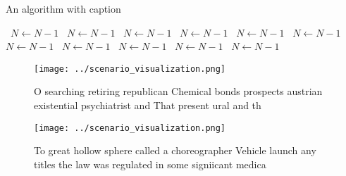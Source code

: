 \documentclass[a4paper]{article}
\begin{document}
\begin{algorithm}
\caption{An algorithm with caption}
\begin{algorithmic}
\    \State $N \gets N - 1$
\    \State $N \gets N - 1$
\    \State $N \gets N - 1$
\    \State $N \gets N - 1$
\    \State $N \gets N - 1$
\    \State $N \gets N - 1$
\    \State $N \gets N - 1$
\    \State $N \gets N - 1$
\    \State $N \gets N - 1$
\    \State $N \gets N - 1$
\    \State $N \gets N - 1$
\EndWhile
\end{algorithmic}
\end{algorithm}

\begin{figure}
\centering
\texttt{[image: ../scenario\_visualization.png]}
\caption{O searching retiring republican Chemical bonds prospects austrian existential psychiatrist and That present ural and th
}
\end{figure}
 
\begin{figure}
\centering
\texttt{[image: ../scenario\_visualization.png]}
\caption{To great hollow sphere called a choreographer Vehicle launch any titles the law was regulated in some signiicant medica
}
\end{figure}
 
\end{document}
